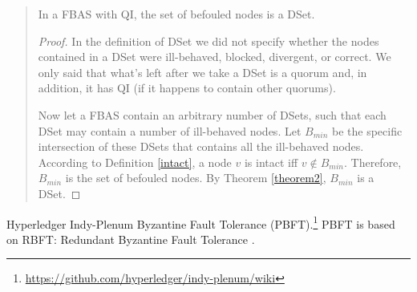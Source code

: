 \begin{quote}
\small
\begin{theorem}
\label{theorem3}
In a FBAS with QI, the set of befouled nodes is a DSet.
\end{theorem}
\begin{proof}
In the definition of DSet we did not specify whether the nodes contained in a DSet were ill-behaved, blocked, divergent, or correct. We only said that what's left after we take a DSet is a quorum and, in addition, it has QI (if it happens to contain other quorums).

\vspace{0.3cm}
Now let a FBAS contain an arbitrary number of DSets, such that each DSet may contain a number of ill-behaved nodes. Let $B_{min}$ be the specific intersection of these DSets that contains all the ill-behaved nodes. According to Definition \ref{intact}, a node $v$ is intact iff $v \notin B_{min}$. Therefore, $B_{min}$ is the set of befouled nodes. By Theorem \ref{theorem2}, $B_{min}$ is a DSet.
\end{proof}
\end{quote}





\newpage




Hyperledger Indy-Plenum Byzantine Fault Tolerance (PBFT).\footnote{\url{https://github.com/hyperledger/indy-plenum/wiki}} PBFT is based on RBFT: Redundant Byzantine Fault Tolerance
\cite{Aublinetal2013}.











